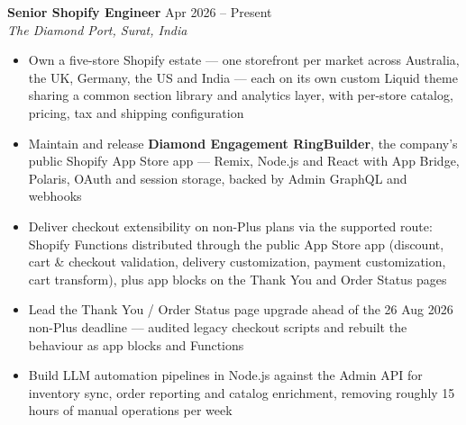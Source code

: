 \documentclass[10pt]{article}
\begin{document}
\textbf{Senior Shopify Engineer} \hfill Apr 2026 -- Present \\
\textit{The Diamond Port, Surat, India}
\begin{itemize}
  \item Own a five-store Shopify estate --- one storefront per market across Australia, the UK, Germany, the US and India --- each on its own custom Liquid theme sharing a common section library and analytics layer, with per-store catalog, pricing, tax and shipping configuration
  \item Maintain and release \textbf{Diamond Engagement RingBuilder}, the company's public Shopify App Store app --- Remix, Node.js and React with App Bridge, Polaris, OAuth and session storage, backed by Admin GraphQL and webhooks
  \item Deliver checkout extensibility on non-Plus plans via the supported route: Shopify Functions distributed through the public App Store app (discount, cart \& checkout validation, delivery customization, payment customization, cart transform), plus app blocks on the Thank You and Order Status pages
  \item Lead the Thank You / Order Status page upgrade ahead of the 26 Aug 2026 non-Plus deadline --- audited legacy checkout scripts and rebuilt the behaviour as app blocks and Functions
  \item Build LLM automation pipelines in Node.js against the Admin API for inventory sync, order reporting and catalog enrichment, removing roughly 15 hours of manual operations per week
\end{itemize}

\vspace{1pt}
\end{document}
